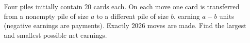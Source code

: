 Four piles initially contain $20$ cards each. On each move one card is transferred from a nonempty pile of size $a$ to a different pile of size $b$, earning $a-b$ units (negative earnings are payments). Exactly $2026$ moves are made. Find the largest and smallest possible net earnings.
